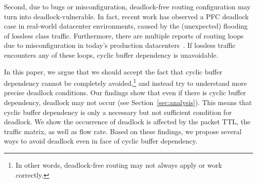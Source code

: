 Second, due to bugs or misconfiguration, deadlock-free routing configuration may
turn into deadlock-vulnerable. In fact, recent work has observed a PFC deadlock
case in real-world datacenter environments\cite{rdmascale}, caused by the
(unexpected) flooding of lossless class traffic. Furthermore, there are multiple
reports of routing loops due to misconfiguration in today's production
datacenters~\cite{everflow, libra}. If lossless traffic encounters any of these
loops, cyclic buffer dependency is unavoidable.

In this paper, we argue that we should accept the fact that cyclic buffer
dependency cannot be completely avoided,\footnote{In other words, deadlock-free
routing may not always apply or work correctly.} and instead try to
understand more precise deadlock conditions.  Our findings show that even if
there is cyclic buffer dependency, deadlock may not occur (see
Section~\ref{sec:analysis}).  This means that cyclic buffer dependency is only a
necessary but not sufficient condition for deadlock.  We show the occurrence of
deadlock is affected by the packet TTL, the traffic matrix, as well as flow
rate. Based on these findings, we propose several ways to avoid deadlock even in
face of cyclic buffer dependency.


